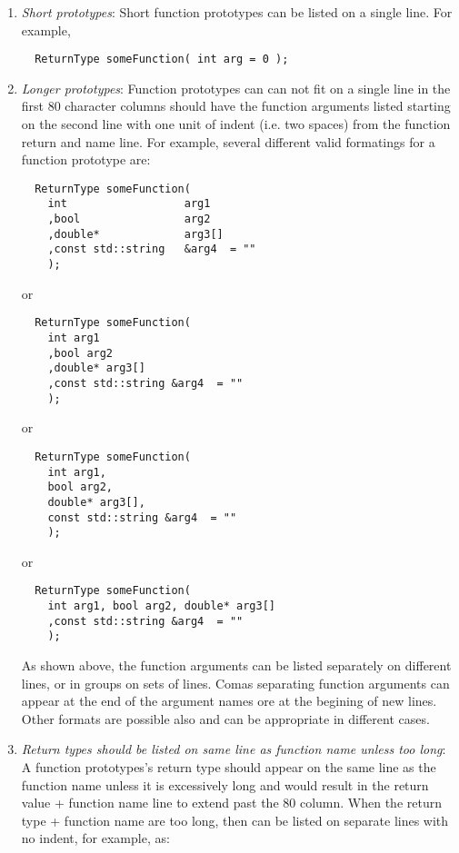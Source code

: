 \begin{enumerate}
\begin{enumerate}
  {}\item\textit{Short prototypes}: Short function prototypes can be listed
  on a single line.  For example,

  \begin{verbatim}
  ReturnType someFunction( int arg = 0 );
  \end{verbatim}

  {}\item\textit{Longer prototypes}: Function prototypes can can not fit on a
  single line in the first 80 character columns should have the function
  arguments listed starting on the second line with one unit of indent
  (i.e. two spaces) from the function return and name line.  For example,
  several different valid formatings for a function prototype are:

  \begin{verbatim}
  ReturnType someFunction(
    int                  arg1
    ,bool                arg2
    ,double*             arg3[]
    ,const std::string   &arg4  = ""
    );
  \end{verbatim}
  
  or
  
  \begin{verbatim}
  ReturnType someFunction(
    int arg1
    ,bool arg2
    ,double* arg3[]
    ,const std::string &arg4  = ""
    );
  \end{verbatim}
  
  or
  
  \begin{verbatim}
  ReturnType someFunction(
    int arg1,
    bool arg2,
    double* arg3[],
    const std::string &arg4  = ""
    );
  \end{verbatim}
  
  or
  
  \begin{verbatim}
  ReturnType someFunction(
    int arg1, bool arg2, double* arg3[]
    ,const std::string &arg4  = ""
    );
  \end{verbatim}

  As shown above, the function arguments can be listed separately on different
  lines, or in groups on sets of lines.  Comas separating function arguments
  can appear at the end of the argument names ore at the begining of new
  lines.  Other formats are possible also and can be appropriate in different
  cases.

  {}\item\textit{Return types should be listed on same line as function name
  unless too long}: A function prototypes's return type should appear on the
  same line as the function name unless it is excessively long and would
  result in the return value + function name line to extend past the 80
  column.  When the return type + function name are too long, then can be
  listed on separate lines with no indent, for example, as:
  

\end{enumerate}
\end{enumerate}

